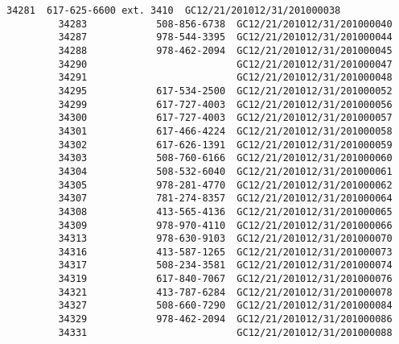 \documentclass[11pt]{article}
\begin{document}
\begin{Verbatim}[commandchars=\\\{\}]
         34281  617-625-6600 ext. 3410  GC12/21/201012/31/201000038   
         34283            508-856-6738  GC12/21/201012/31/201000040   
         34287            978-544-3395  GC12/21/201012/31/201000044   
         34288            978-462-2094  GC12/21/201012/31/201000045   
         34290                          GC12/21/201012/31/201000047   
         34291                          GC12/21/201012/31/201000048   
         34295            617-534-2500  GC12/21/201012/31/201000052   
         34299            617-727-4003  GC12/21/201012/31/201000056   
         34300            617-727-4003  GC12/21/201012/31/201000057   
         34301            617-466-4224  GC12/21/201012/31/201000058   
         34302            617-626-1391  GC12/21/201012/31/201000059   
         34303            508-760-6166  GC12/21/201012/31/201000060   
         34304            508-532-6040  GC12/21/201012/31/201000061   
         34305            978-281-4770  GC12/21/201012/31/201000062   
         34307            781-274-8357  GC12/21/201012/31/201000064   
         34308            413-565-4136  GC12/21/201012/31/201000065   
         34309            978-970-4110  GC12/21/201012/31/201000066   
         34313            978-630-9103  GC12/21/201012/31/201000070   
         34316            413-587-1265  GC12/21/201012/31/201000073   
         34317            508-234-3581  GC12/21/201012/31/201000074   
         34319            617-840-7067  GC12/21/201012/31/201000076   
         34321            413-787-6284  GC12/21/201012/31/201000078   
         34327            508-660-7290  GC12/21/201012/31/201000084   
         34329            978-462-2094  GC12/21/201012/31/201000086   
         34331                          GC12/21/201012/31/201000088   
         

\end{Verbatim}
\end{document}
